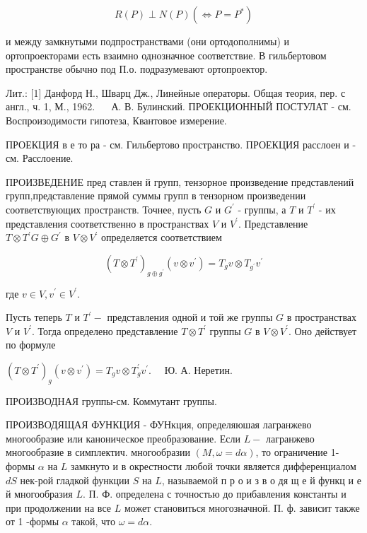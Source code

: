 \documentclass[10pt]{article}
\begin{document}
\[

R(P) \perp N(P)\left(\Leftrightarrow P=P^{*}\right)

\]



и между замкнутыми подпространствами (они ортодополнимы) и ортопроекторами есть взаимно однозначное соответствие. В гильбертовом пространстве обычно под П.о. подразумевают ортопроектор.



Лит.: [1] Данфорд Н., Шварц Дж., Линейные операторы. Общая теория, пер. с англ., ч. 1, М., 1962. $\quad$ А. В. Булинский. ПРОЕКЦИОННЫЙ ПОСТУЛАТ - см. Воспроизодимости гипотеза, Квантовое измерение.



ПРОЕКЦИЯ в е то ра - см. Гильбертово пространство. ПРОЕКЦИЯ расслоен и - см. Расслоение.



ПРОИЗВЕДЕНИЕ пред ставлен й групп, тензорное произведение представлений групп,представление прямой суммы групп в тензорном произведении соответствующих пространств. Точнее, пусть $G$ и $G^{\prime}$ - группы, а $T$ и $T^{\prime}$ - их представления соответственно в пространствах $V$ и $V^{\prime}$. Представление $T \otimes T^{\prime} G \oplus G^{\prime}$ в $V \otimes V^{\prime}$ определяется соответствием



\[

\left(T \otimes T^{\prime}\right)_{g \oplus g^{\prime}}\left(v \otimes v^{\prime}\right)=T_{g} v \otimes T_{g^{\prime}} v^{\prime}

\]



где $v \in V, v^{\prime} \in V^{\prime}$.



Пусть теперь $T$ и $T^{\prime}-$ представления одной и той же группы $G$ в пространствах $V$ и $V^{\prime}$. Тогда определено представление $T \otimes T^{\prime}$ группы $G$ в $V \otimes V^{\prime}$. Оно действует по формуле



$\left(T \otimes T^{\prime}\right)_{g}\left(v \otimes v^{\prime}\right)=T_{g} v \otimes T_{g}^{\prime} v^{\prime} . \quad$ Ю. А. Неретин.



ПРОИЗВОДНАЯ группы-см. Коммутант группы.



ПРОИЗВОДЯЩАЯ ФУНКЦИЯ - ФУНкция, определяюшая лагранжево многообразие или каноническое преобразование. Если $L-$ лагранжево многообразие в симплектич. многообразии $(M, \omega=d \alpha)$, то ограничение 1-формы $\alpha$ на $L$ замкнуто и в окрестности любой точки является дифференциалом $d S$ нек-рой гладкой функции $S$ на $L$, называемой п р о и з в о дя щ е й функц и е й многообразия $L$. П. Ф. определена с точностью до прибавления константы и при продолжении на все $L$ может становиться многозначной. П. ф. зависит также от 1 -формы $\alpha$ такой, что $\omega=d \alpha$.
\end{document}
